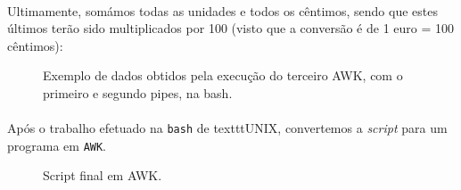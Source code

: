\documentclass[11pt,a4paper]{report}
\begin{document}
\paragraph*{}Ultimamente, somámos todas as unidades e todos os cêntimos, sendo que estes últimos terão sido multiplicados por 100 (visto que a conversão é de 1 euro = 100 cêntimos):

\begin{figure}[H]
\centering
\noindent{}
\caption{Exemplo de dados obtidos pela execução do terceiro AWK, com o primeiro e segundo pipes, na bash.}
\end{figure}

\paragraph*{}Após o trabalho efetuado na \texttt{bash} de texttt{UNIX}, convertemos a \textit{script} para um programa em \texttt{AWK}.

\begin{figure}[H]
\centering
\noindent{}
\caption{Script final em AWK.}
\end{figure}
\end{document}
